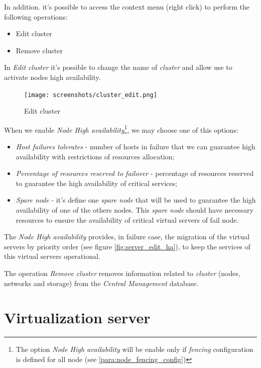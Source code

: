 In addition. it's possible to access the context menu (right click) to perform the following operations:
\begin{itemize}
    \item Edit cluster
    \item Remove cluster
\end{itemize}

In \emph{Edit cluster} it's possible to change the name of \emph{cluster} and allow use to activate nodes high availability.
\begin{figure}[H]
       \begin{center}
       \texttt{[image: screenshots/cluster\_edit.png]}
       \caption{Edit cluster}
       \label{fig:cluster_edit}
       \end{center}
\end{figure}

When we enable \emph{Node High availability}\footnote{The option \emph{Node High availability} will be enable only if \emph{fencing} configuration is defined for all node (see \ref{para:node_fencing_config})}, we may choose one of this options:

\begin{itemize}
    \item \emph{Host failures tolerates} - number of hosts in failure that we can guarantee high availability with restrictions of resources allocation;
    \item \emph{Percentage of resources reserved to failover} - percentage of resources reserved to guarantee the high availability of critical services;
    \item \emph{Spare node} - it's define one \emph{spare node} that will be used to guarantee the high availability of one of the others nodes. This \emph{spare node} should have necessary resources to ensure the availability of critical virtual servers of fail node.
\end{itemize}

The \emph{Node High availability} provides, in failure case, the migration of the virtual servers by priority order (see figure \ref{fig:server_edit_ha}), to keep the services of this virtual servers operational.

The operation \emph{Remove cluster} removes information related to \emph{cluster} (nodes, networks and storage) from the \emph{Central Management} database.


\section{Virtualization server}
\label{sec:node}

